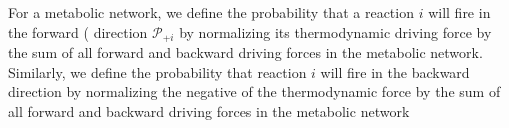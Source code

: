 For a metabolic network, we define the probability that a reaction $i$ will fire in the forward (  direction ${\mathcal P_{+i}}$ by normalizing its thermodynamic driving force by the sum of all forward and backward driving forces in the metabolic network. Similarly, we define the probability that reaction $i$ will fire in the backward direction by normalizing the negative of the thermodynamic force by  the sum of all forward and backward driving forces in the metabolic network